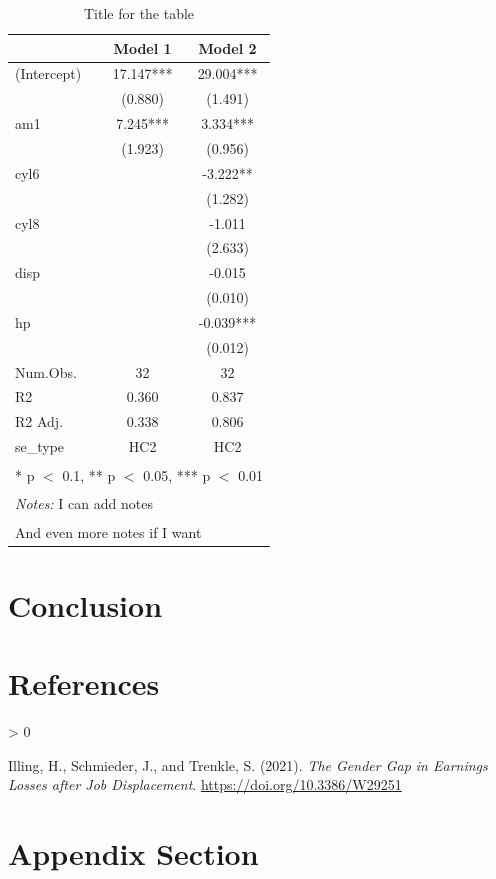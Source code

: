 \documentclass[
  11pt,
a4paper
]{article}
\newlength{\cslhangindent}
\newenvironment{CSLReferences}[2] %
 {%
  \setlength{\parindent}{0pt}
  \ifodd #1 \everypar{\setlength{\hangindent}{\cslhangindent}}\ignorespaces\fi
  \ifnum #2 > 0
  \setlength{\parskip}{#2\baselineskip}
  \fi
 }%
 {}
\begin{document}
\begin{table}

\caption{\label{tab:reg}Title for the table}
\centering
\begin{tabular}[t]{lcc}
\toprule
  & Model 1 & Model 2\\
\midrule
(Intercept) & 17.147*** & 29.004***\\
 & (0.880) & (1.491)\\
am1 & 7.245*** & 3.334***\\
 & (1.923) & (0.956)\\
cyl6 &  & -3.222**\\
 &  & (1.282)\\
cyl8 &  & -1.011\\
 &  & (2.633)\\
disp &  & -0.015\\
 &  & (0.010)\\
hp &  & -0.039***\\
 &  & (0.012)\\
\midrule
Num.Obs. & 32 & 32\\
R2 & 0.360 & 0.837\\
R2 Adj. & 0.338 & 0.806\\
se\_type & HC2 & HC2\\
\bottomrule
\multicolumn{3}{l}{\textsuperscript{} * p $<$ 0.1, ** p $<$ 0.05, *** p $<$ 0.01}\\
\multicolumn{3}{l}{\textsuperscript{} \emph{Notes:} I can add notes}\\
\multicolumn{3}{l}{\textsuperscript{} And even more notes if I want}\\
\end{tabular}
 \end{table}

\FloatBarrier

\hypertarget{conclusion}{%
\section{Conclusion}\label{conclusion}}

\clearpage

\hypertarget{references}{%
\section*{References}\label{references}}

\hypertarget{refs}{}
\begin{CSLReferences}{1}{0}
\leavevmode\hypertarget{ref-Illing2020}{}%
Illing, H., Schmieder, J., and Trenkle, S. (2021). \emph{{The Gender Gap in Earnings Losses after Job Displacement}}. \url{https://doi.org/10.3386/W29251}

\end{CSLReferences}

\appendix
\clearpage

\hypertarget{appendix-section}{%
\section{Appendix Section}\label{appendix-section}}

\FloatBarrier
\end{document}
